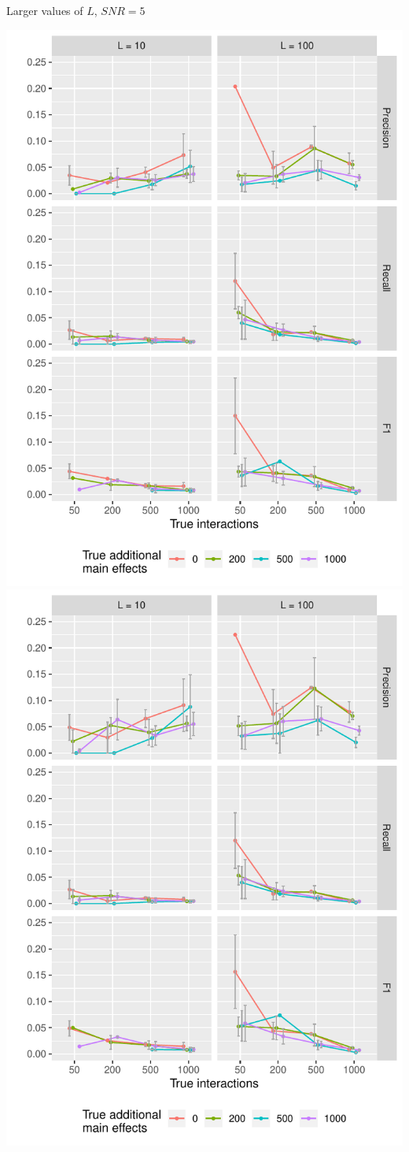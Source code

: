 \begin{frame}{Larger values of $L$, $SNR = 5$}
\begin{center}
	\begin{minipage}{0.9\linewidth}
		\centering
		\includegraphics[width=0.5\linewidth]{"l_diff/l_diff_n10000_SNR5_tno"}%
		\includegraphics[width=0.5\linewidth]{"l_diff/l_diff_n10000_SNR5_tyes"}
	\end{minipage}
\end{center}

\end{frame}

